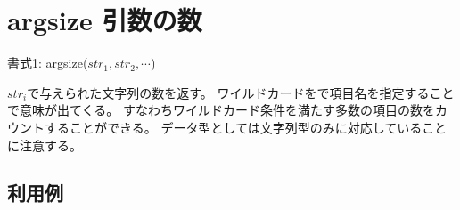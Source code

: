 
%

\section{argsize 引数の数\label{sect:argsize}}

書式1: argsize($str_1,str_2,\cdots$)

$str_i$で与えられた文字列の数を返す。
ワイルドカードをで項目名を指定することで意味が出てくる。
すなわちワイルドカード条件を満たす多数の項目の数をカウントすることができる。
データ型としては文字列型のみに対応していることに注意する。

\subsection*{利用例}


%

